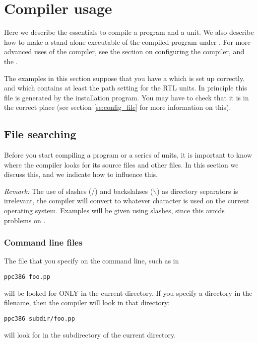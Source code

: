 \documentclass{report}
\begin{document}
\chapter{Compiler usage}
\label{ch:Usage}

Here we describe the essentials to compile a program and a unit. 
We also describe how to make a stand-alone executable of the 
compiled program under \dos. For more advanced uses of the compiler, 
see the section on configuring the compiler, and the 
\progref.

The examples in this section suppose that you have a  which
is set up correctly, and which contains at least the path setting for the
RTL units. In principle this file is generated by the installation program.
You may have to check that it is in the correct place (see section
\ref{se:config_file} for more information on this).

\section{File searching}
Before you start compiling a program or a series of units, it is 
important to know where the compiler looks for its source files and other
files. In this section we discuss this, and we indicate how to influence
this.

{\em Remark:}
The use of slashes (/) and backslahses ($\backslash$) as directory separators 
is irrelevant, the compiler will convert to whatever character is used on
the current operating system. Examples will be given using slashes, since
this avoids problems on \linux. 

\subsection{Command line files}
The file that you specify on the command line, such as in
\begin{verbatim}
ppc386 foo.pp
\end{verbatim}
will be looked for ONLY in the current directory. If you specify a directory
in the filename, then the compiler will look in that directory:
\begin{verbatim}
ppc386 subdir/foo.pp
\end{verbatim}
will look for  in the subdirectory  of the current
directory.
\end{document}

